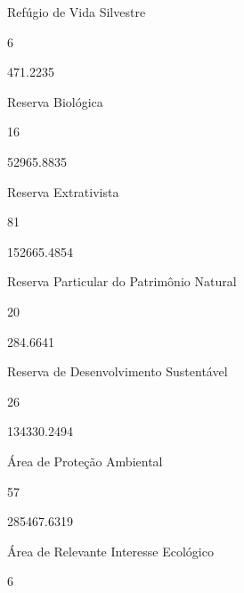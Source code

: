 \documentclass[
  letterpaper,
]{report}
\begin{document}
Refúgio de Vida Silvestre

\n      

6

\n      

471.2235

\n    

\n    

\n      

Reserva Biológica

\n      

16

\n      

52965.8835

\n    

\n    

\n      

Reserva Extrativista

\n      

81

\n      

152665.4854

\n    

\n    

\n      

Reserva Particular do Patrimônio Natural

\n      

20

\n      

284.6641

\n    

\n    

\n      

Reserva de Desenvolvimento Sustentável

\n      

26

\n      

134330.2494

\n    

\n    

\n      

Área de Proteção Ambiental

\n      

57

\n      

285467.6319

\n    

\n    

\n      

Área de Relevante Interesse Ecológico

\n      

6
\end{document}
